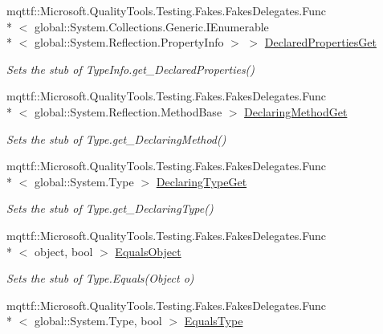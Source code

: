 \begin{DoxyCompactItemize}
mqttf\-::\-Microsoft.\-Quality\-Tools.\-Testing.\-Fakes.\-Fakes\-Delegates.\-Func\\*
$<$ global\-::\-System.\-Collections.\-Generic.\-I\-Enumerable\\*
$<$ global\-::\-System.\-Reflection.\-Property\-Info $>$ $>$ \hyperlink{class_system_1_1_reflection_1_1_fakes_1_1_stub_type_delegator_a724eac8e024efafe8e9478b6e4594990}{Declared\-Properties\-Get}
\begin{DoxyCompactList}\small\item\em Sets the stub of Type\-Info.\-get\-\_\-\-Declared\-Properties()\end{DoxyCompactList}\item 
mqttf\-::\-Microsoft.\-Quality\-Tools.\-Testing.\-Fakes.\-Fakes\-Delegates.\-Func\\*
$<$ global\-::\-System.\-Reflection.\-Method\-Base $>$ \hyperlink{class_system_1_1_reflection_1_1_fakes_1_1_stub_type_delegator_a7817f8b00b04b63b8d84b8dfb382f245}{Declaring\-Method\-Get}
\begin{DoxyCompactList}\small\item\em Sets the stub of Type.\-get\-\_\-\-Declaring\-Method()\end{DoxyCompactList}\item 
mqttf\-::\-Microsoft.\-Quality\-Tools.\-Testing.\-Fakes.\-Fakes\-Delegates.\-Func\\*
$<$ global\-::\-System.\-Type $>$ \hyperlink{class_system_1_1_reflection_1_1_fakes_1_1_stub_type_delegator_accaa6566e7850bc6568947198e2e7a97}{Declaring\-Type\-Get}
\begin{DoxyCompactList}\small\item\em Sets the stub of Type.\-get\-\_\-\-Declaring\-Type()\end{DoxyCompactList}\item 
mqttf\-::\-Microsoft.\-Quality\-Tools.\-Testing.\-Fakes.\-Fakes\-Delegates.\-Func\\*
$<$ object, bool $>$ \hyperlink{class_system_1_1_reflection_1_1_fakes_1_1_stub_type_delegator_ae7ca48d521a2d6b18dfcf0db7111a1c1}{Equals\-Object}
\begin{DoxyCompactList}\small\item\em Sets the stub of Type.\-Equals(\-Object o)\end{DoxyCompactList}\item 
mqttf\-::\-Microsoft.\-Quality\-Tools.\-Testing.\-Fakes.\-Fakes\-Delegates.\-Func\\*
$<$ global\-::\-System.\-Type, bool $>$ \hyperlink{class_system_1_1_reflection_1_1_fakes_1_1_stub_type_delegator_ad43366615f2bad2727b597736ee17afd}{Equals\-Type}

\end{DoxyCompactItemize}
